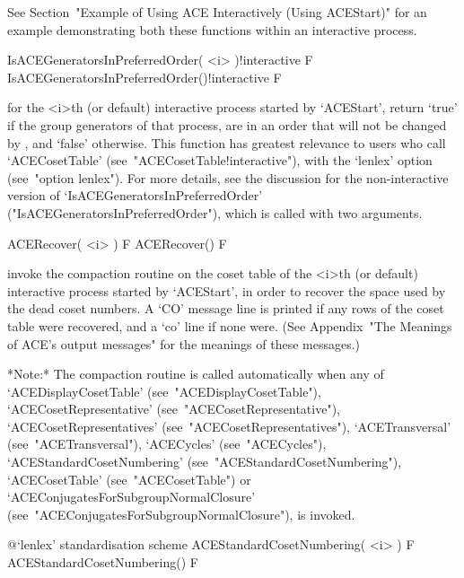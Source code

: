 See Section~"Example of Using ACE Interactively (Using ACEStart)"  for
an example demonstrating both these functions  within  an  interactive
process.

\>IsACEGeneratorsInPreferredOrder( <i> )!{interactive} F
\>IsACEGeneratorsInPreferredOrder()!{interactive} F

for the <i>th (or  default)  interactive  {\ACE}  process  started  by
`ACEStart', return `true' if the group generators of that process, are
in an order that will not be changed by {\ACE}, and `false' otherwise.
This function has greatest relevance to users who call `ACECosetTable'
(see~"ACECosetTable!interactive"),   with    the    `lenlex'    option
(see~"option lenlex"). For more details, see the  discussion  for  the
non-interactive    version    of     `IsACEGeneratorsInPreferredOrder'
("IsACEGeneratorsInPreferredOrder"),  which   is   called   with   two
arguments.


\>ACERecover( <i> ) F
\>ACERecover() F

invoke the compaction routine on the coset  table  of  the  <i>th  (or
default) interactive {\ACE} process started by `ACEStart', in order to
recover the space used by the dead coset numbers. A `CO' message  line
is printed if any rows of the coset table were recovered, and  a  `co'
line if  none  were.  (See  Appendix~"The  Meanings  of  ACE's  output
messages" for the meanings of these messages.)

*Note:*
The  compaction  routine  is  called   automatically   when   any   of
`ACEDisplayCosetTable'                   (see~"ACEDisplayCosetTable"),
`ACECosetRepresentative'               (see~"ACECosetRepresentative"),
`ACECosetRepresentatives'             (see~"ACECosetRepresentatives"),
`ACETransversal'          (see~"ACETransversal"),          `ACECycles'
(see~"ACECycles"),                         `ACEStandardCosetNumbering'
(see~"ACEStandardCosetNumbering"),                     `ACECosetTable'
(see~"ACECosetTable")    or    `ACEConjugatesForSubgroupNormalClosure'
(see~"ACEConjugatesForSubgroupNormalClosure"), is invoked.

%
{@\noexpand`lenlex' standardisation scheme}
\>ACEStandardCosetNumbering( <i> ) F
\>ACEStandardCosetNumbering() F

